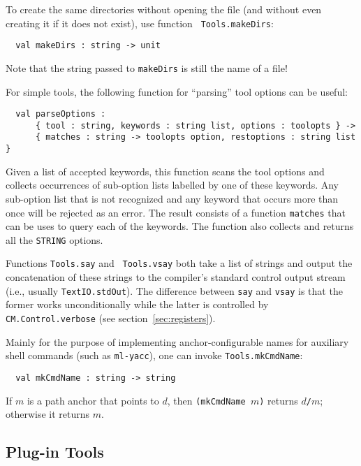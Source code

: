 To create the same directories without opening the file (and without
even creating it if it does not exist), use function {\tt
Tools.makeDirs}:

\begin{verbatim}
  val makeDirs : string -> unit
\end{verbatim}

Note that the string passed to {\tt makeDirs} is still the name of a
file!

  For simple tools, the following
function for ``parsing'' tool options can be useful:

\begin{verbatim}
  val parseOptions :
      { tool : string, keywords : string list, options : toolopts } ->
      { matches : string -> toolopts option, restoptions : string list }
\end{verbatim}

Given a list of accepted keywords, this function scans the tool
options and collects occurrences of sub-option lists labelled by one
of these keywords.  Any sub-option list that is not recognized and any
keyword that occurs more than once will be rejected as an error.  The
result consists of a function {\tt matches} that can be uses to query
each of the keywords.  The function also collects and returns all the
{\tt STRING} options.

 Functions {\tt Tools.say} and {\tt
Tools.vsay} both take a list of strings and output the concatenation
of these strings to the compiler's standard control output stream
(i.e., usually {\tt TextIO.stdOut}).  The difference between {\tt say}
and {\tt vsay} is that the former works unconditionally while the
latter is controlled by {\tt CM.Control.verbose} (see
section~\ref{sec:registers}).

 Mainly for the purpose of
implementing anchor-configurable names for auxiliary shell commands
(such as {\tt ml-yacc}), one can invoke {\tt Tools.mkCmdName}:

\begin{verbatim}
  val mkCmdName : string -> string
\end{verbatim}

If $m$ is a path anchor that points to $d$, then {\tt (mkCmdName $m$)}
returns $d${\tt /}$m$; otherwise it returns $m$.

\subsection{Plug-in Tools}
\label{sec:plugintools}

